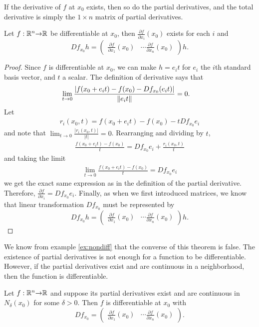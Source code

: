 If the derivative of $f$ at $x_0$ exists, then so do the partial
derivatives, and the total derivative is simply the $1 \times n$
matrix of partial derivatives.
\begin{theorem}\label{thm:tdiff}
  Let $f: \mathbb{R}^n {\rightarrow} \mathbb{R}$ be differentiable at $x_0$, then
  $\frac{\partial f}{\partial x_i}(x_0)$ exists for each $i$ and 
  \[ Df_{x_0} h = \begin{pmatrix} \frac{ \partial f}{\partial x_1}(x_0) &
    \cdots \frac{ \partial f}{\partial x_n }(x_0)
  \end{pmatrix} h. \]
\end{theorem}
\begin{proof}
  Since $f$ is differentiable at $x_0$, we can make $h = e_i t$ for
  $e_i$ the $i$th standard basis vector, and $t$ a scalar. The
  definition of derivative says that
  \begin{align*}
    \lim_{t {\rightarrow} 0} \frac{\left|f(x_0 + e_i t) - f(x_0) - Df_{x_0} (e_i t)\right|}
    {\left\Vert {e_i t} \right\Vert } & = 0.
  \end{align*}
  Let 
  \begin{align*}
    r_i(x_0,t) = f(x_0 + e_i t) - f(x_0) - t D f_{x_0} e_i 
  \end{align*}
  and note that $\lim_{t \to 0} \frac{|r_i(x_0,t)|}{|t|} =
  0$. Rearranging and dividing by $t$, 
  \begin{align*}
    \frac{f(x_0 + e_i t) - f(x_0)}{t} = D f_{x_0} e_i + \frac{r_i(x_0,t)}{t}
  \end{align*}
  and taking the limit
  \begin{align*}
    \lim_{t \to 0} \frac{f(x_0 + e_i t) - f(x_0)}{t} = D f_{x_0} e_i 
  \end{align*}
  we get the exact same expression as in the definition of the partial
  derivative. Therefore, $\frac{\partial f}{\partial x_i} = D
  f_{x_0}e_i$. Finally, as when we first introduced matrices, we know
  that linear transformation $D f_{x_0}$ must be represented by
  \[ Df_{x_0} h = \begin{pmatrix} \frac{ \partial f}{\partial x_1}(x_0) &
    \cdots \frac{ \partial f}{\partial x_n }(x_0)
  \end{pmatrix} h. \]
\end{proof}
We know from example \ref{ex:nondiff} that the converse of this
theorem is false. The existence of partial derivatives is not enough
for a function to be differentiable. However, if the partial
derivatives exist and are continuous in a neighborhood, then the
function is differentiable. 
\begin{theorem}\label{thm:ptdiff}
  Let $f:\mathbb{R}^n {\rightarrow} \mathbb{R}$ and suppose its partial derivatives exist and
  are continuous in $N_\delta(x_0)$ for some $\delta>0$. Then $f$
  is differentiable at $x_0$ with 
  \[ Df_{x_0}= \begin{pmatrix} \frac{ \partial f}{\partial x_1}(x_0) &
    \cdots \frac{ \partial f}{\partial x_n }(x_0)
  \end{pmatrix}. \]
\end{theorem}
